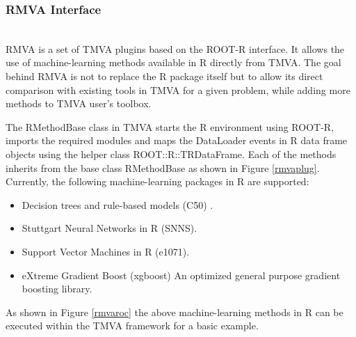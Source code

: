 \documentclass[a4paper]{jpconf}
\begin{document}
\subsubsection{RMVA Interface}\label{RMVA}\hspace*{\fill} \\
RMVA is a set of TMVA plugins based on the ROOT-R interface. It allows the use of machine-learning methods available in R directly from TMVA. The goal behind RMVA is not to replace the R package itself but to allow its direct comparison with existing tools in TMVA for a given problem, while adding more methods to TMVA user’s toolbox.
   

The RMethodBase class in TMVA starts the R environment using ROOT-R, imports the required modules and maps the DataLoader events in R data frame objects using the helper class ROOT::R::TRDataFrame.
Each of the methods inherits from the base class RMethodBase as shown in Figure \ref{rmvaplug}. 
Currently, the following machine-learning packages in R are supported: 

\begin{itemize}  
\item Decision trees and rule-based models (C50) \cite{c50}.
\item Stuttgart Neural Networks in R (SNNS)\cite{rsnns}.
\item Support Vector Machines in R (e1071)\cite{e1071}.
\item eXtreme Gradient Boost (xgboost) An optimized general purpose gradient boosting library\cite{chen2015xgboost}.
\end{itemize}

As shown in Figure \ref{rmvaroc} the above machine-learning methods in R can be executed within the TMVA framework for a basic example.
\end{document}

